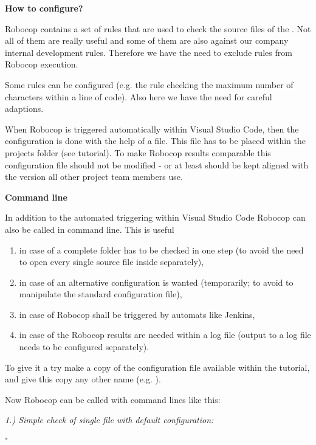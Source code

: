 \textbf{How to configure?}

Robocop contains a set of rules that are used to check the source files of the \rfw. Not all of them are really useful and some of them are also against
our company internal development rules. Therefore we have the need to exclude rules from Robocop execution.

Some rules can be configured (e.g. the rule checking the maximum number of characters within a line of code). Also here we have the need for careful adaptions.

When Robocop is triggered automatically within Visual Studio Code, then the configuration is done with the help of a  file. This file has to be placed 
within the projects folder (see tutorial). To make Robocop results comparable this configuration file should not be modified - or at least should be kept aligned with
the version all other project team members use.

\newpage

\textbf{Command line}

In addition to the automated triggering within Visual Studio Code Robocop can also be called in command line. This is useful
\begin{enumerate}
   \item in case of a complete folder has to be checked in one step (to avoid the need to open every single source file inside separately),
   \item in case of an alternative configuration is wanted (temporarily; to avoid to manipulate the standard configuration file),
   \item in case of Robocop shall be triggered by automats like Jenkins,
   \item in case of the Robocop results are needed within a log file (output to a log file needs to be configured separately).
\end{enumerate}

To give it a try make a copy of the configuration file  available within the tutorial, and give this copy any other name (e.g. ).

Now Robocop can be called with command lines like this:

\vspace{2ex}

\textit{1.) Simple check of single file with default configuration:}

\begin{pythoncode}
"%
\end{pythoncode}

